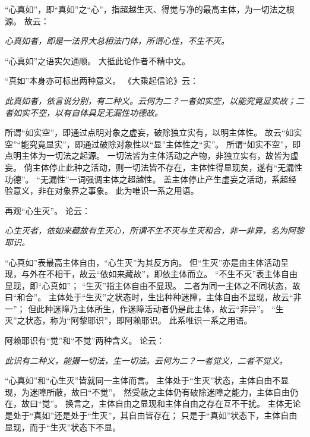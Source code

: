 \documentclass[11pt]{article}
\begin{document}
\newline

“心真如”，即“真如”之“心”，指超越生灭、得觉与净的最高主体，为一切法之根源。
故云：

\textit{心真如者，即是一法界大总相法门体，所谓心性，不生不灭。}

“心真如”之语实欠通顺。
大抵此论作者不精中文。

\newline

“真如”本身亦可标出两种意义。
《大乘起信论》云：

\textit{此真如者，依言说分别，有二种义。云何为二？一者如实空，以能究竟显实故；二者如实不空，以有自体具足无漏性功德故。}

所谓“如实空”，即通过点明对象之虚妄，破除独立实有，以明主体性。
故云“如实空”“能究竟显实”，即通过破除对象性以“显”主体性之“实”。
所谓“如实不空”，即点明主体为一切法之起源。
一切法皆为主体活动之产物，非独立实有，故皆为虚妄。
倘主体停止此种之活动，则一切法皆不存在，主体性得显现矣，遂有“无漏性功德”。
“无漏性”一词强调主体之超越性。
盖主体停止产生虚妄之活动，系超经验意义，非在对象界之事象。
此为唯识一系之用语。

\newline

再观“心生灭”。
论云：

\textit{心生灭者，依如来藏故有生灭心，所谓不生不灭与生灭和合，非一非异，名为阿黎耶识。}

“心真如”表最高主体自由，“心生灭”为其反方向。
但“生灭”亦是由主体活动呈现，与外在不相干，故云“依如来藏故”，即依主体而立。
“不生不灭”表主体自由显现，即“心真如”；
“生灭”指主体自由不显现。
二者为同一主体之不同状态，故曰“和合”。
主体处于“生灭”之状态时，生出种种迷障，主体自由不显现，故云“非一”；
但此种迷障乃主体所生，作迷障活动者仍是此主体，故云“非异”。
“生灭”之状态，称为“阿黎耶识”，即阿赖耶识。
此系唯识一系之用语。

\newline

阿赖耶识有“觉”和“不觉”两种含义。
论云：

\textit{此识有二种义，能摄一切法，生一切法。云何为二？一者觉义，二者不觉义。}

“心真如”和“心生灭”皆就同一主体而言。
主体处于“生灭”状态，主体自由不显现，为迷障所蔽，故曰“不觉”。
然受蔽之主体仍有破除迷障之能力，主体自由仍在，故曰“觉”。
换言之，主体自由之显现和主体自由之存在互不干扰。
主体无论是处于“真如”还是处于“生灭”，其自由皆存在；
只是于“真如”状态下，主体自由显现，而于“生灭”状态下不显。

\newline
\end{document}
